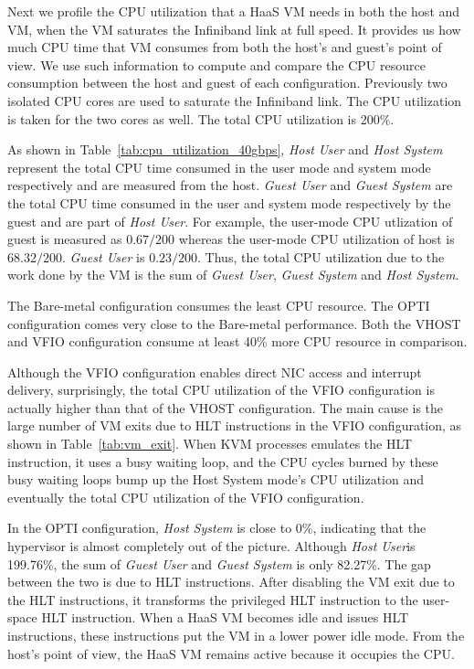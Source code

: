 Next we profile the CPU utilization that a HaaS VM needs in
both the host and VM, when the VM saturates the Infiniband
link at full speed. It provides us how much CPU time that VM
consumes from both the host's and guest's point of view. We
use such information to compute and compare the CPU resource
consumption between the host and guest of each configuration.
Previously two isolated CPU cores are used to saturate the
Infiniband link. The CPU utilization is taken for the two
cores as well. The total CPU utilization is 200\%.

As shown in Table~\ref{tab:cpu_utilization_40gbps}, \emph{Host
User} and \emph{Host System} represent the total CPU time
consumed in the user mode and system mode respectively and are
measured from the host. \emph{Guest User} and \emph{Guest
System} are the total CPU time consumed in the user and system
mode respectively by the guest and are part of \emph{Host
User}. For example, the user-mode CPU utlization of guest is
measured as $0.67/200$ whereas the user-mode CPU utilization
of host is $68.32/200$. \emph{Guest User} is $0.23/200$.
Thus, the total CPU utilization due to the work done by the VM
is the sum of \emph{Guest User}, \emph{Guest System} and
\emph{Host System}.

The Bare-metal configuration consumes the least CPU resource.
The OPTI configuration comes very close to the Bare-metal
performance. Both the VHOST and VFIO configuration consume at
least 40\% more CPU resource in comparison.

Although the VFIO configuration enables direct NIC access and
interrupt delivery, surprisingly, the total CPU utilization of
the VFIO configuration is actually higher than that of the
VHOST configuration. The main cause is the large number of VM
exits due to HLT instructions in the VFIO configuration, as
shown in Table~\ref{tab:vm_exit}. When KVM processes emulates
the HLT instruction, it uses a busy waiting loop, and the CPU
cycles burned by these busy waiting loops bump up the Host
System mode's CPU utilization and eventually the total CPU
utilization of the VFIO configuration.

In the OPTI configuration, \emph{Host System} is close to 0\%,
indicating that the hypervisor is almost completely out of the
picture. Although \emph{Host User}is 199.76\%, the sum of
\emph{Guest User} and \emph{Guest System} is only 82.27\%. The
gap between the two is due to HLT instructions. After
disabling the VM exit due to the HLT instructions, it
transforms the privileged HLT instruction to the user-space
HLT instruction.  When a HaaS VM becomes idle and issues HLT
instructions, these instructions put the VM in a lower power
idle mode. From the host's point of view, the HaaS VM remains
active because it occupies the CPU.

